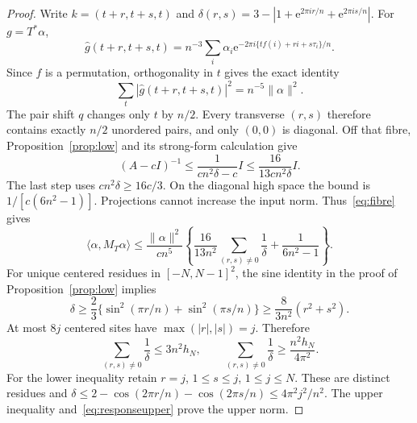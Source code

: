 \documentclass[11pt]{article}
\newcommand{\norm}[1]{\lVert#1\rVert}
\newcommand{\ip}[2]{\langle#1,#2\rangle}
\newcommand{\e}{\mathrm e}
\theoremstyle{definition}
\theoremstyle{remark}
\begin{document}
\begin{proof}
Write $k=(t+r,t+s,t)$ and
$\delta(r,s)=3-|1+\e^{2\pi ir/n}+\e^{2\pi is/n}|$.
For $g=T^*\alpha$,
\[
 \widehat g(t+r,t+s,t)=n^{-3}\sum_i\alpha_i
   \e^{-2\pi i\{tf(i)+ri+s\tau_i\}/n}.
\]
Since $f$ is a permutation, orthogonality in $t$ gives the exact identity
\begin{equation}\label{eq:fibre}
       \sum_t|\widehat g(t+r,t+s,t)|^2=n^{-5}\norm\alpha^2.
\end{equation}
The pair shift $q$ changes only $t$ by $n/2$. Every transverse $(r,s)$
therefore contains exactly $n/2$ unordered pairs, and only $(0,0)$ is
diagonal. Off that fibre, Proposition~\ref{prop:low} and its strong-form
calculation give
\[
 (A-cI)^{-1}\le\frac1{cn^2\delta-c}I
             \le\frac{16}{13cn^2\delta}I.
\]
The last step uses $cn^2\delta\ge16c/3$. On the diagonal high space the
bound is $1/[c(6n^2-1)]$. Projections cannot increase the input norm.
Thus~\eqref{eq:fibre} gives
\begin{equation}\label{eq:responseupper}
 \ip\alpha{M_T\alpha}\le\frac{\norm\alpha^2}{cn^5}
 \left\{\frac{16}{13n^2}\sum_{(r,s)\ne0}\frac1\delta
                           +\frac1{6n^2-1}\right\}.
\end{equation}
For unique centered residues in $[-N,N-1]^2$, the sine identity in the
proof of Proposition~\ref{prop:low} implies
\[
 \delta\ge\frac23\{\sin^2(\pi r/n)+\sin^2(\pi s/n)\}
          \ge\frac8{3n^2}(r^2+s^2).
\]
At most $8j$ centered sites have $\max(|r|,|s|)=j$. Therefore
\begin{equation}\label{eq:latticesums}
 \sum_{(r,s)\ne0}\frac1\delta\le3n^2h_N,
 \qquad
 \sum_{(r,s)\ne0}\frac1\delta\ge\frac{n^2h_N}{4\pi^2}.
\end{equation}
For the lower inequality retain $r=j$, $1\le s\le j$, $1\le j\le N$.
These are distinct residues and
$\delta\le2-\cos(2\pi r/n)-\cos(2\pi s/n)\le4\pi^2j^2/n^2$.
The upper inequality and~\eqref{eq:responseupper} prove the upper norm.


\end{proof}
\end{document}
